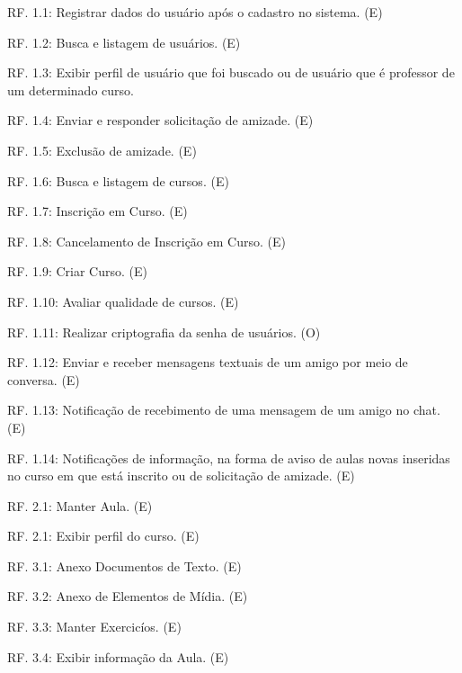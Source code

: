 \documentclass[12pt,a4paper,onecolumn,titlepage]{article}
\begin{document}
\begin{description}


\item RF. 1.1: Registrar dados do usuário após o cadastro no sistema. (E)

\item RF. 1.2: Busca e listagem de usuários. (E)

\item RF. 1.3: Exibir perfil de usuário que foi buscado ou de usuário que é professor de um determinado curso.

\item RF. 1.4: Enviar e responder solicitação de amizade. (E)

\item RF. 1.5: Exclusão de amizade. (E)

\item RF. 1.6: Busca e listagem de cursos. (E)
 
\item RF. 1.7: Inscrição em Curso. (E)

\item RF. 1.8: Cancelamento de Inscrição em Curso. (E)

\item RF. 1.9: Criar Curso. (E)

\item RF. 1.10: Avaliar qualidade de cursos. (E)

\item RF. 1.11: Realizar criptografia da senha de usuários. (O)

\item RF. 1.12: Enviar e receber mensagens textuais de um amigo por meio de conversa. (E)

\item RF. 1.13: Notificação de recebimento de uma mensagem de um amigo no chat. (E)

\item RF. 1.14: Notificações de informação, na forma de aviso de aulas novas inseridas no curso em que está inscrito ou de solicitação de amizade. (E)

\item RF. 2.1: Manter Aula. (E)

\item RF. 2.1: Exibir perfil do curso. (E)


\item RF. 3.1: Anexo Documentos de Texto. (E)

\item RF. 3.2: Anexo de Elementos de Mídia. (E)

\item RF. 3.3: Manter Exercicíos. (E)

\item RF. 3.4: Exibir informação da Aula. (E)

\end{description}
\end{document}
